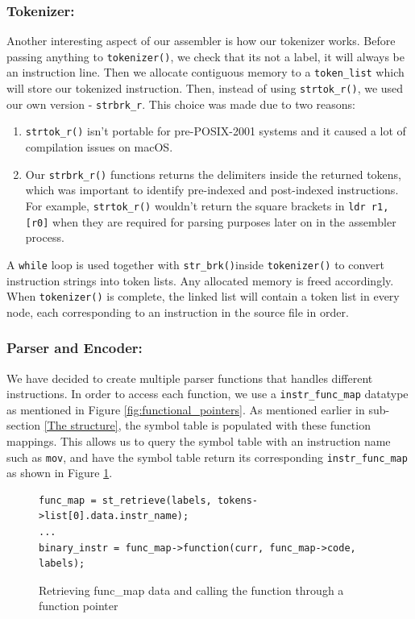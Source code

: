 \documentclass[a4paper]{article}
\begin{document}
\subsubsection{Tokenizer:}
Another interesting aspect of our assembler is how our tokenizer works. Before passing anything to \verb|tokenizer()|, we check that its not a label, it will always be an instruction line. Then we allocate contiguous memory to a \verb|token_list| which will store our tokenized instruction. Then, instead of using \verb|strtok_r()|, we used our own version - \verb|strbrk_r|. This choice was made due to two reasons:
\begin{enumerate}
    \item \verb|strtok_r()| isn't portable for pre-POSIX-2001 systems and it caused a lot of compilation issues on macOS.
    \item Our \verb|strbrk_r()| functions returns the delimiters inside the returned tokens, which was important to identify pre-indexed and post-indexed instructions. For example, \verb|strtok_r()| wouldn't return the square brackets in \verb|ldr r1, [r0]| when they are required for parsing purposes later on in the assembler process.
\end{enumerate}
A \verb|while| loop is used together with \verb|str_brk()|inside \verb|tokenizer()| to convert instruction strings into token lists. Any allocated memory is freed accordingly. When \verb|tokenizer()| is complete, the linked list will contain a token list in every node, each corresponding to an instruction in the source file in order.

\subsubsection{Parser and Encoder:}
We have decided to create multiple parser functions that handles different instructions. In order to access each function, we use a \verb|instr_func_map| datatype as mentioned in Figure \ref{fig:functional_pointers}. As mentioned earlier in sub-section \ref{The structure}, the symbol table is populated with these function mappings. This allows us to query the symbol table with an instruction name such as \verb|mov|, and have the symbol table return its corresponding \verb|instr_func_map| as shown in Figure \ref{fig:calling functions with func map}.


\begin{figure}[htp]
\centering
\begin{BVerbatim}
func_map = st_retrieve(labels, tokens->list[0].data.instr_name);
...
binary_instr = func_map->function(curr, func_map->code, labels);
\end{BVerbatim}
\caption{Retrieving func\_map data and calling the function through a function pointer}
\label{fig:calling functions with func map}
\end{figure}
\end{document}
